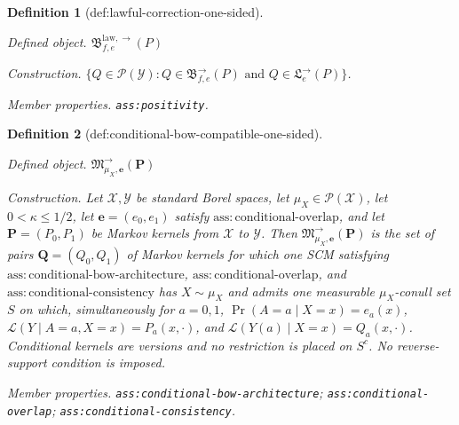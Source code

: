 \documentclass{article}
\newtheorem{definition}{Definition}
\begin{document}
\begin{definition}[def:lawful-correction-one-sided]\label{def:lawful-correction-one-sided}
\par\smallskip\noindent\emph{Defined object.} \(\mathfrak B^{\mathrm{law},\to}_{f,e}(P)\)
\par\smallskip\noindent\emph{Construction.} \(\{Q\in\mathcal P(\mathcal Y):Q\in\mathfrak B^{\to}_{f,e}(P)\text{ and }Q\in\mathfrak L^{\to}_e(P)\}\).
\par\smallskip\noindent\emph{Member properties.} \texttt{ass:\allowbreak{}positivity}.
\end{definition}

\begin{definition}[def:conditional-bow-compatible-one-sided]\label{def:conditional-bow-compatible-one-sided}
\par\smallskip\noindent\emph{Defined object.} \(\mathfrak M^{\to}_{\mu_X,\boldsymbol e}(\boldsymbol P)\)
\par\smallskip\noindent\emph{Construction.} Let \(\mathcal X,\mathcal Y\) be standard Borel spaces, let \(\mu_X\in\mathcal P(\mathcal X)\), let \(0<\kappa\le1/2\), let \(\boldsymbol e=(e_0,e_1)\) satisfy \(\mathrm{ass:conditional\text{-}overlap}\), and let \(\boldsymbol P=(P_0,P_1)\) be Markov kernels from \(\mathcal X\) to \(\mathcal Y\).  Then \(\mathfrak M^{\to}_{\mu_X,\boldsymbol e}(\boldsymbol P)\) is the set of pairs \(\boldsymbol Q=(Q_0,Q_1)\) of Markov kernels for which one SCM satisfying \(\mathrm{ass:conditional\text{-}bow\text{-}architecture}\), \(\mathrm{ass:conditional\text{-}overlap}\), and \(\mathrm{ass:conditional\text{-}consistency}\) has \(X\sim\mu_X\) and admits one measurable \(\mu_X\)-conull set \(S\) on which, simultaneously for \(a=0,1\), \(\Pr(A=a\mid X=x)=e_a(x)\), \(\mathcal L(Y\mid A=a,X=x)=P_a(x,\cdot)\), and \(\mathcal L(Y(a)\mid X=x)=Q_a(x,\cdot)\).  Conditional kernels are versions and no restriction is placed on \(S^c\).  No reverse-support condition is imposed.
\par\smallskip\noindent\emph{Member properties.} \texttt{ass:\allowbreak{}conditional-\allowbreak{}bow-\allowbreak{}architecture}; \texttt{ass:\allowbreak{}conditional-\allowbreak{}overlap}; \texttt{ass:\allowbreak{}conditional-\allowbreak{}consistency}.
\end{definition}
\end{document}
